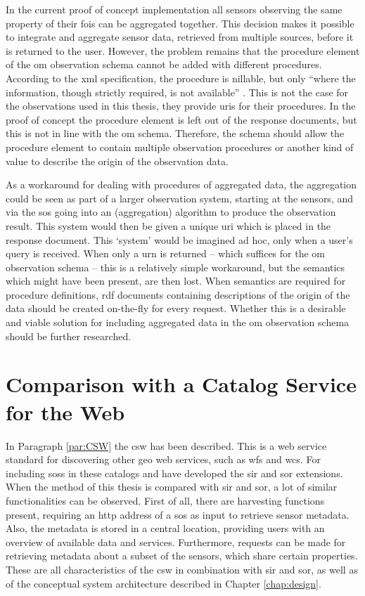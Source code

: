 In the current proof of concept implementation all sensors observing the same property of their \acp{foi} can be aggregated together. This decision makes it possible to integrate and aggregate sensor data, retrieved from multiple sources, before it is returned to the user. However, the problem remains that the procedure element of the \ac{om} observation schema cannot be added with different procedures. According to the \ac{xml} specification, the procedure is nillable, but only \enquote{where the information, though strictly required, is not available} \citep[p. 42]{SW:OGC8}. This is not the case for the observations used in this thesis, they provide \acp{uri} for their procedures. In the proof of concept the procedure element is left out of the response documents, but this is not in line with the \ac{om} schema. Therefore, the schema should allow the procedure element to contain multiple observation procedures or another kind of value to describe the origin of the observation data. 

As a workaround for dealing with procedures of aggregated data, the aggregation could be seen as part of a larger observation system, starting at the sensors, and via the \ac{sos} going into an (aggregation) algorithm to produce the observation result. This system would then be given a unique \ac{uri} which is placed in the response document. This `system' would be imagined ad hoc, only when a user's query is received. When only a \ac{urn} is returned -- which suffices for the \ac{om} observation schema -- this is a relatively simple workaround, but the semantics which might have been present, are then lost. When semantics are required for procedure definitions, \ac{rdf} documents containing descriptions of the origin of the data should be created on-the-fly for every request. Whether this is a desirable and viable solution for including aggregated data in the \ac{om} observation schema should be further researched.        

\section{Comparison with a Catalog Service for the Web}
In Paragraph \ref{par:CSW} the \acl{csw} has been described. This is a web service standard for discovering other geo web services, such as \ac{wfs} and \ac{wcs}. For including \aclp{sos} in these catalogs \cite{SW:OGC4} and \cite{SW:OGC3} have developed the \ac{sir} and \ac{sor} extensions. When the method of this thesis is compared with \ac{sir} and \ac{sor}, a lot of similar functionalities can be observed. First of all, there are harvesting functions present, requiring an \ac{http} address of a \ac{sos} as input to retrieve sensor metadata. Also, the metadata is stored in a central location, providing users with an overview of available data and services. Furthermore, requests can be made for retrieving metadata about a subset of the sensors, which share certain properties. These are all characteristics of the \ac{csw} in combination with \ac{sir} and \ac{sor}, as well as of the conceptual system architecture described in Chapter \ref{chap:design}.  

